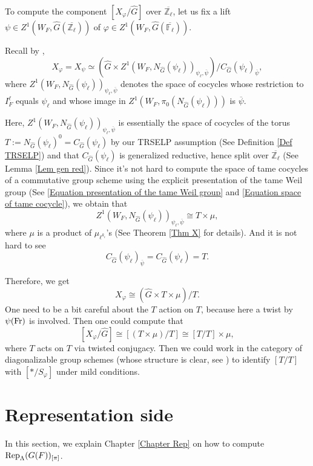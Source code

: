 To compute the component $[X_{\varphi}/\hat{G}]$ over $\overline{\mathbb{Z}_{\ell}}$, let us fix a lift $\psi \in Z^1(W_F, \hat{G}(\overline{\mathbb{Z}_{\ell}}))$ of $\varphi \in Z^1(W_F, \hat{G}(\overline{\mathbb{F}_{\ell}}))$.

Recall by \cite[Subsection 4.6]{dat2022ihes},
$$X_{\varphi}=X_{\psi} \simeq \left(\hat{G} \times Z^1(W_F, N_{\hat{G}}(\psi_{\ell}))_{\psi_{\ell}, \overline{\psi}}\right)/C_{\hat{G}}(\psi_{\ell})_{\overline{\psi}},$$
where $Z^1(W_F, N_{\hat{G}}(\psi_{\ell}))_{\psi_{\ell}, \overline{\psi}}$  denotes the space of cocycles whose restriction to $I_F^{\ell}$ equals $\psi_{\ell}$ and whose image in $Z^1(W_F, \pi_0(N_{\hat{G}}(\psi_{\ell})))$ is $\overline{\psi}$. 

Here, $Z^1(W_F, N_{\hat{G}}(\psi_{\ell}))_{\psi_{\ell}, \overline{\psi}}$ is essentially the space of cocycles of the torus $T:=N_{\hat{G}}(\psi_{\ell})^0=C_{\hat{G}}(\psi_{\ell})$ by our TRSELP assumption (See Definition \ref{Def TRSELP}) and that $C_{\hat{G}}(\psi_{\ell})$ is generalized reductive, hence split over $\overline{\mathbb{Z}_{\ell}}$ (See Lemma \ref{Lem gen red}). Since it's not hard to compute the space of tame cocycles of a commutative group scheme using the explicit presentation of the tame Weil group (See \ref{Equation presentation of the tame Weil group} and \ref{Equation space of tame cocycle}), we obtain that 
$$Z^1(W_F, N_{\hat{G}}(\psi_{\ell}))_{\psi_{\ell}, \overline{\psi}} \cong T \times \mu,$$
where $\mu$ is a product of $\mu_{\ell^{k_i}}$'s (See Theorem \ref{Thm X} for details).
And it is not hard to see 
$$C_{\hat{G}}(\psi_{\ell})_{\overline{\psi}}=C_{\hat{G}}(\psi_{\ell})=T.$$

Therefore, we get 
$$X_{\varphi} \cong \left(\hat{G} \times T \times \mu\right)/T.$$
One need to be a bit careful about the $T$ action on $T$, because here a twist by $\psi(\operatorname{Fr})$ is involved. Then one could compute that 
$$[X_{\varphi}/\hat{G}] \cong [\left(T \times \mu\right)/T] \cong [T/T] \times \mu,$$
where $T$ acts on $T$ via twisted conjugacy. Then we could work in the category of diagonalizable group schemes (whose structure is clear, see \cite[p70, Section 5]{brochard2014autour}) to identify $[T/T]$ with $[*/S_{\varphi}]$ under mild conditions.

\section{Representation side}
In this section, we explain Chapter \ref{Chapter Rep} on how to compute $\operatorname{\operatorname{Rep}}_{\Lambda}(G(F))_{[\pi]}$.

